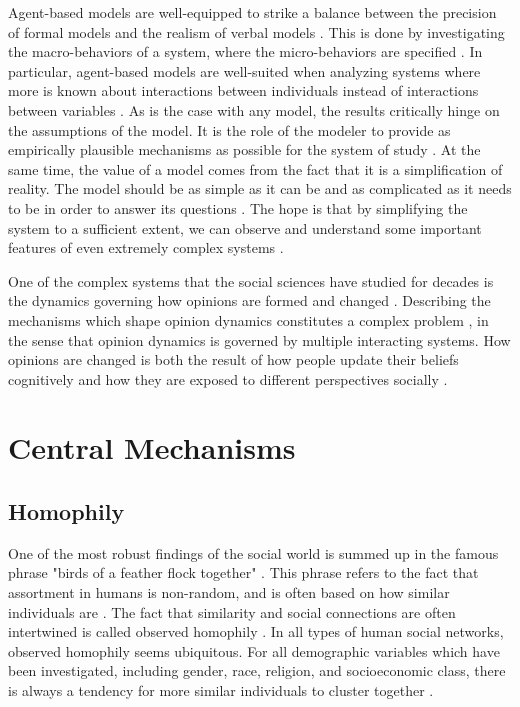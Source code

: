 \documentclass[11pt]{article}
\begin{document}
Agent-based models are well-equipped to strike a balance between the precision of formal models and the realism of verbal models \cite{flache_between_2018,galesic_integrating_2021,epstein1999agent,mas2014cultural}. This is done by investigating the macro-behaviors of a system, where the micro-behaviors are specified \cite{bruch_agent-based_2015,epstein1999agent,flache_between_2018}. In particular, agent-based models are well-suited when analyzing systems where more is known about interactions between individuals instead of interactions between variables \cite{geschke2019triple}. As is the case with any model, the results critically hinge on the assumptions of the model. It is the role of the modeler to provide as empirically plausible mechanisms as possible for the system of study \cite{crooks2012introduction,epstein1999agent,page2010diversity}. At the same time, the value of a model comes from the fact that it is a simplification of reality. The model should be as simple as it can be and as complicated as it needs to be in order to answer its questions \cite{smaldino_how_2020}. The hope is that by simplifying the system to a sufficient extent, we can observe and understand some important features of even extremely complex systems \cite{fogarty_ten_2022,smaldino_models_2016, smaldino_how_2020, smaldino_models_2022}.

\noindent One of the complex systems that the social sciences have studied for decades is the dynamics governing how opinions are formed and changed \cite{flache_models_2017}. Describing the mechanisms which shape opinion dynamics constitutes a complex problem \cite{mas2019challenges}, in the sense that opinion dynamics is governed by multiple interacting systems. 
How opinions are changed is both the result of how people update their beliefs cognitively and how they are exposed to different perspectives socially \cite{friedkin_social_1990,spears_social_2021}. 

\section{Central Mechanisms}

\subsection{Homophily}
One of the most robust findings of the social world is summed up in the famous phrase "birds of a feather flock together" \cite{mcpherson_birds_2001}. This phrase refers to the fact that assortment in humans is non-random, and is often based on how similar individuals are \cite{asikainen_cumulative_2020,crandall_feedback_2008,mcpherson_birds_2001}. The fact that similarity and social connections are often intertwined is called observed homophily \cite{mcpherson_birds_2001,kossinets_origins_2009}. In all types of human social networks, observed homophily seems ubiquitous.
For all demographic variables which have been investigated, including gender, race, religion, and socioeconomic class, there is always a tendency for more similar individuals to cluster together \cite{asikainen_cumulative_2020,mcpherson_birds_2001, taylor_exploring_2018}. 
\end{document}
